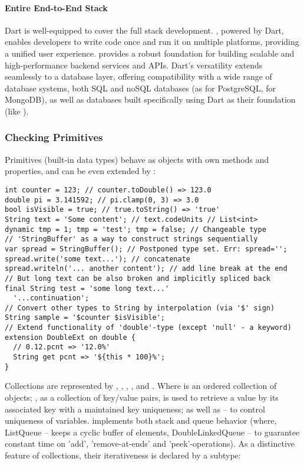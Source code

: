 \paragraph{Entire End-to-End Stack}

Dart is well-equipped to cover the full stack development. , powered by Dart, enables developers to write
code once and run it on multiple platforms, providing a unified user experience.  provides a robust
foundation for building scalable and high-performance backend services and APIs. Dart's versatility extends
seamlessly to a database layer, offering compatibility with a wide range of database systems, both SQL and
noSQL databases (as  for PostgreSQL,  for MongoDB), as well as databases built specifically
using Dart as their foundation (like ).


\newpage
\subsubsection{Checking Primitives} \label{dart-prim}

Primitives (built-in data types) behave as objects with own methods and properties, and can be even extended
by :

\begin{lstlisting}
int counter = 123; // counter.toDouble() => 123.0
double pi = 3.141592; // pi.clamp(0, 3) => 3.0
bool isVisible = true; // true.toString() => 'true'
String text = 'Some content'; // text.codeUnits // List<int>
dynamic tmp = 1; tmp = 'test'; tmp = false; // Changeable type
// 'StringBuffer' as a way to construct strings sequentially
var spread = StringBuffer(); // Postponed type set. Err: spread='';
spread.write('some text...'); // concatenate
spread.writeln('... another content'); // add line break at the end
// But long text can be also broken and implicitly spliced back
final String test = 'some long text...'
  '...continuation';
// Convert other types to String by interpolation (via '$' sign)
String sample = '$counter $isVisible';
// Extend functionality of 'double'-type (except 'null' - a keyword)
extension DoubleExt on double {
  // 0.12.pcnt => '12.0%'
  String get pcnt => '${this * 100}%';
}
\end{lstlisting}

\noindent Collections are represented by , , , , and . Where  is an
ordered collection of objects; , as a collection of key/value pairs, is used to retrieve a value by its
associated key with a maintained key uniqueness; as well as  -- to control uniqueness of variables. 
implements both stack and queue behavior (where, ListQueue -- keeps a cyclic buffer of elements, DoubleLinkedQueue --
to guarantee constant time on 'add', 'remove-at-ends' and 'peek'-operations). As a distinctive feature of collections,
their iterativeness is declared by a subtype:

